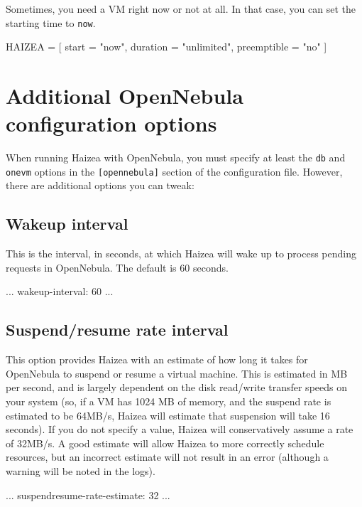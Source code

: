 Sometimes, you need a VM right now or not at all. In that case, you can set the starting time to \texttt{now}.

\begin{wideshellverbatim}
HAIZEA = [
  start        = "now",
  duration     = "unlimited",
  preemptible  = "no"
]
\end{wideshellverbatim}

\section{Additional OpenNebula configuration options}

When running Haizea with OpenNebula, you must specify at least the \texttt{db} and \texttt{onevm} options in the \texttt{[opennebula]} section of the configuration file. However, there are additional options you can tweak:

\subsection{Wakeup interval}

This is the interval, in seconds, at which Haizea will wake up to process pending requests in OpenNebula. The default is 60 seconds.

\begin{wideshellverbatim}
[opennebula]
...
wakeup-interval: 60
...
\end{wideshellverbatim}

\subsection{Suspend/resume rate interval}

This option provides Haizea with an estimate of how long it takes for OpenNebula to suspend or resume a virtual machine. This is estimated in MB per second, and is largely dependent on the disk read/write transfer speeds on your system (so, if a VM has 1024 MB of memory, and the suspend rate is estimated to be 64MB/s, Haizea will estimate that suspension will take 16 seconds). If you do not specify a value, Haizea will conservatively assume a rate of 32MB/s. A good estimate will allow Haizea to more correctly schedule resources, but an incorrect estimate will not result in an error (although a warning will be noted in the logs).

\begin{wideshellverbatim}
[opennebula]
...
suspendresume-rate-estimate: 32
...
\end{wideshellverbatim}

